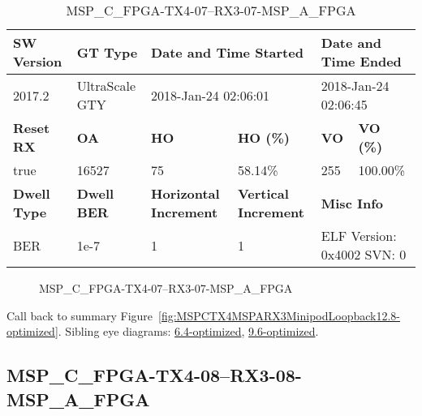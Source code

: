 \begin{table}[h]
\centering
\caption{MSP\_C\_FPGA-TX4-07--RX3-07-MSP\_A\_FPGA}
\label{tab:MSPCFPGATX407RX307MSPAFPGA12.8-optimized}
\begin{tabular}{@{}|l|l|l|l|l|l|@{}}
\toprule
\textbf{SW Version}                & \textbf{GT Type}   & \multicolumn{2}{l|}{\textbf{Date and Time Started}}            & \multicolumn{2}{l|}{\textbf{Date and Time Ended}}        \\ \midrule
2017.2                       & UltraScale GTY          & \multicolumn{2}{l|}{2018-Jan-24 02:06:01}                   & \multicolumn{2}{l|}{2018-Jan-24 02:06:45}               \\ \midrule
\textbf{Reset RX}                  & \textbf{OA} & \textbf{HO}   & \textbf{HO (\%)} & \textbf{VO} & \textbf{VO (\%)} \\ \midrule
true & 16527        & 75          & 58.14\%        & 255        & 100.00\%       \\ \midrule
\textbf{Dwell Type}                & \textbf{Dwell BER} & \textbf{Horizontal Increment} & \textbf{Vertical Increment}    & \multicolumn{2}{l|}{\textbf{Misc Info}}                  \\ \midrule
BER                            & 1e-7        & 1        & 1           & \multicolumn{2}{l|}{ELF Version: 0x4002 SVN: 0}                         \\ \bottomrule
\end{tabular}
\end{table}

\begin{figure}[h]
\caption{MSP\_C\_FPGA-TX4-07--RX3-07-MSP\_A\_FPGA} \label{fig:MSPCFPGATX407RX307MSPAFPGA12.8-optimized}
\end{figure}

Call back to summary Figure~\ref{fig:MSPCTX4MSPARX3MinipodLoopback12.8-optimized}.
Sibling eye diagrams: \hyperref[sec:MSPCFPGATX407RX307MSPAFPGA6.4-optimized]{6.4-optimized}, \hyperref[sec:MSPCFPGATX407RX307MSPAFPGA9.6-optimized]{9.6-optimized}.

\clearpage
\newpage


\subsection{MSP\_C\_FPGA-TX4-08--RX3-08-MSP\_A\_FPGA}\label{sec:MSPCFPGATX408RX308MSPAFPGA12.8-optimized}

